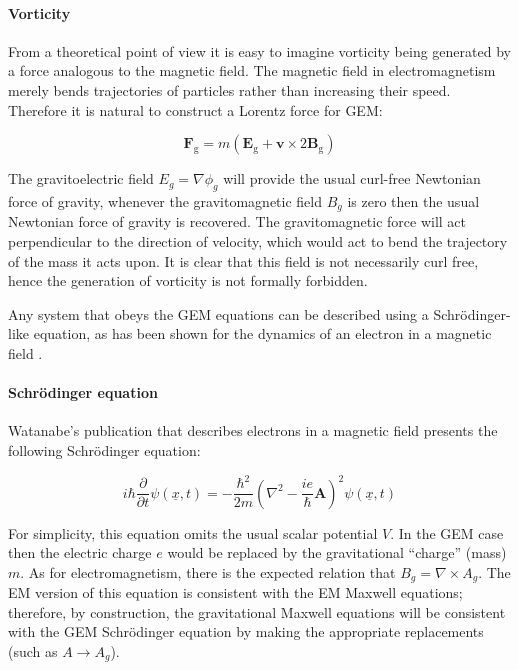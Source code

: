 \paragraph{Vorticity}
From a theoretical point of view it is easy to imagine vorticity being generated by a force analogous to the magnetic field. The magnetic field in electromagnetism merely bends trajectories of particles rather than increasing their speed. Therefore it is natural to construct a Lorentz force for GEM:

\begin{equation}
\mathbf{F}_\text{g} = m \left( \mathbf{E}_\text{g} + \mathbf{v} \times 2 \mathbf{B}_\text{g} \right) 
\end{equation}

\noindent The gravitoelectric field $E_g = \nabla\phi_g$ will provide the usual curl-free Newtonian force of gravity, whenever the gravitomagnetic field $B_g$ is zero then the usual Newtonian force of gravity is recovered. The gravitomagnetic force will act perpendicular to the direction of velocity, which would act to bend the trajectory of the mass it acts upon. It is clear that this field is not necessarily curl free, hence the generation of vorticity is not formally forbidden.

Any system that obeys the GEM equations can be described using a Schr\"odinger-like equation, as has been shown for the dynamics of an electron in a magnetic field \citep{bib_wat2}.

\paragraph{Schr\"odinger equation}
Watanabe's publication \citep{bib_wat2} that describes electrons in a magnetic field presents the following Schr\"odinger equation:

\begin{equation}
i\hbar\frac{\partial}{\partial t}\psi(\underline{x},t) =-\frac{\hbar^2}{2m}\left(\nabla^2-\frac{ie}{\hbar}\mathbf{A}\right)^2 \psi(\underline{x},t)
\end{equation}

\noindent For simplicity, this equation omits the usual scalar potential $V$. In the GEM case then the electric charge $e$ would be replaced by the gravitational ``charge'' (mass) $m$. As for electromagnetism, there is the expected relation that $B_g = \nabla \times A_g$. The EM version of this equation is consistent with the EM Maxwell equations; therefore, by construction, the gravitational Maxwell equations will be consistent with the GEM Schr\"odinger equation by making the appropriate replacements (such as $A \rightarrow A_g$).

